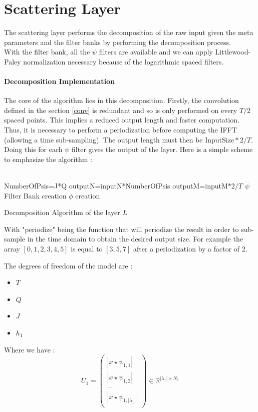 \documentclass[a4paper]{report}
\begin{document}
\section{Scattering Layer}\label{ll}
The scattering layer performs the decomposition of the raw input given the meta parameters and the filter banks by performing the decomposition process. 
\\
With the filter bank, all the $\psi$ filters are available and we can apply Littlewood-Paley normalization necessary because of the logarithmic spaced filters.

\paragraph{Decomposition Implementation}
The core of the algorithm lies in this decomposition. Firstly, the convolution defined in the section \ref{conv} is redundant and so is only performed on every $T/2$ spaced points. This implies a reduced output length and faster computation. Thus, it is necessary to perform a periodization before computing the IFFT (allowing a time sub-sampling). The output length must then be $\text{InputSize}*2/T$. Doing this for each $\psi$ filter gives the output of the layer.
Here is a simple scheme to emphasize the algorithm :
\\
\\
\begin{algorithm}[H]
 NumberOfPsis=J*Q\;
 outputN=inputN*NumberOfPsis\;
 outputM=inputM$*2/T$\;
 $\psi$ Filter Bank creation\;
 $\phi$ creation\;
 \caption{Decomposition Algorithm of the layer $L$}
\end{algorithm}

With "periodize" being the function that will periodize the result in order to sub-sample in the time domain to obtain the desired output size. 
For example the array $[0,1,2,3,4,5]$ is equal to $[3,5,7]$ after a periodization by a factor of $2$.


The degrees of freedom of the model are : 
\begin{itemize}
\item $T$
\item $Q$
\item $J$
\item $h_1$
\end{itemize}
Where we have :\\ 
\[
U_1=\left( \begin{matrix}
|x\star \psi_{1,1} | \\
|x\star \psi_{1,2} | \\
... \\
|x\star \psi_{1,|\lambda_1|} |\\
\end{matrix}
\right)
\in \mathbb{R}^{|\lambda_1|\times N_1}
\]
\end{document}

